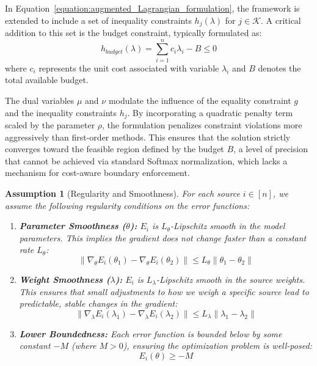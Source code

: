 \documentclass[preprint,12pt,authoryear]{elsarticle}
\newtheorem{assumption}{Assumption}
\begin{document}
In Equation~\ref{equation:augmented_Lagrangian_formulation}, the framework is extended to include a set of inequality constraints $h_j(\lambda)$ for $j \in \mathcal{K}$. A critical addition to this set is the budget constraint, typically formulated as:
\begin{equation}
    h_{budget}(\lambda) = \sum_{i=1}^n c_i \lambda_i - B \leq 0
\end{equation}
where $c_i$ represents the unit cost associated with variable $\lambda_i$ and $B$ denotes the total available budget.

The dual variables $\mu$ and $\nu$ modulate the influence of the equality constraint $g$ and the inequality constraints $h_j$. By incorporating a quadratic penalty term scaled by the parameter $\rho$, the formulation penalizes constraint violations more aggressively than first-order methods. This ensures that the solution strictly converges toward the feasible region defined by the budget $B$, a level of precision that cannot be achieved via standard Softmax normalization, which lacks a mechanism for cost-aware boundary enforcement.

\begin{assumption}[Regularity and Smoothness]\label{assump:reg}
For each source $i \in [n]$, we assume the following regularity conditions on the error functions:
\begin{enumerate}
    \item \textbf{Parameter Smoothness ($\theta$):} $E_i$ is $L_\theta$-Lipschitz smooth in the model parameters. This implies the gradient does not change faster than a constant rate $L_\theta$:
    \begin{equation}
        \|\nabla_\theta E_i(\theta_1) - \nabla_\theta E_i(\theta_2)\| \leq L_\theta\|\theta_1 - \theta_2\|
    \end{equation}
    
    \item \textbf{Weight Smoothness ($\lambda$):} $E_i$ is $L_\lambda$-Lipschitz smooth in the source weights. This ensures that small adjustments to how we weigh a specific source lead to predictable, stable changes in the gradient:
    \begin{equation}
        \|\nabla_\lambda E_i(\lambda_1) - \nabla_\lambda E_i(\lambda_2)\| \leq L_\lambda\|\lambda_1 - \lambda_2\|
    \end{equation}
    
    \item \textbf{Lower Boundedness:} Each error function is bounded below by some constant $-M$ (where $M > 0$), ensuring the optimization problem is well-posed:
    \begin{equation}
        E_i(\theta) \geq -M
    \end{equation}
\end{enumerate}
\end{assumption}
\end{document}
